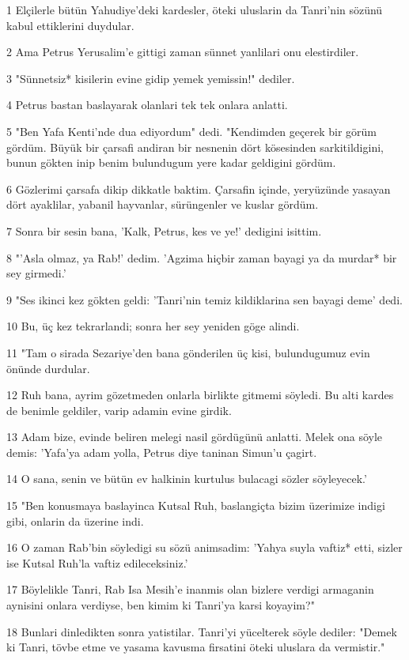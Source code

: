 \par 1 Elçilerle bütün Yahudiye'deki kardesler, öteki uluslarin da Tanri'nin sözünü kabul ettiklerini duydular.
\par 2 Ama Petrus Yerusalim'e gittigi zaman sünnet yanlilari onu elestirdiler.
\par 3 "Sünnetsiz* kisilerin evine gidip yemek yemissin!" dediler.
\par 4 Petrus bastan baslayarak olanlari tek tek onlara anlatti.
\par 5 "Ben Yafa Kenti'nde dua ediyordum" dedi. "Kendimden geçerek bir görüm gördüm. Büyük bir çarsafi andiran bir nesnenin dört kösesinden sarkitildigini, bunun gökten inip benim bulundugum yere kadar geldigini gördüm.
\par 6 Gözlerimi çarsafa dikip dikkatle baktim. Çarsafin içinde, yeryüzünde yasayan dört ayaklilar, yabanil hayvanlar, sürüngenler ve kuslar gördüm.
\par 7 Sonra bir sesin bana, 'Kalk, Petrus, kes ve ye!' dedigini isittim.
\par 8 "'Asla olmaz, ya Rab!' dedim. 'Agzima hiçbir zaman bayagi ya da murdar* bir sey girmedi.'
\par 9 "Ses ikinci kez gökten geldi: 'Tanri'nin temiz kildiklarina sen bayagi deme' dedi.
\par 10 Bu, üç kez tekrarlandi; sonra her sey yeniden göge alindi.
\par 11 "Tam o sirada Sezariye'den bana gönderilen üç kisi, bulundugumuz evin önünde durdular.
\par 12 Ruh bana, ayrim gözetmeden onlarla birlikte gitmemi söyledi. Bu alti kardes de benimle geldiler, varip adamin evine girdik.
\par 13 Adam bize, evinde beliren melegi nasil gördügünü anlatti. Melek ona söyle demis: 'Yafa'ya adam yolla, Petrus diye taninan Simun'u çagirt.
\par 14 O sana, senin ve bütün ev halkinin kurtulus bulacagi sözler söyleyecek.'
\par 15 "Ben konusmaya baslayinca Kutsal Ruh, baslangiçta bizim üzerimize indigi gibi, onlarin da üzerine indi.
\par 16 O zaman Rab'bin söyledigi su sözü animsadim: 'Yahya suyla vaftiz* etti, sizler ise Kutsal Ruh'la vaftiz edileceksiniz.'
\par 17 Böylelikle Tanri, Rab Isa Mesih'e inanmis olan bizlere verdigi armaganin aynisini onlara verdiyse, ben kimim ki Tanri'ya karsi koyayim?"
\par 18 Bunlari dinledikten sonra yatistilar. Tanri'yi yücelterek söyle dediler: "Demek ki Tanri, tövbe etme ve yasama kavusma firsatini öteki uluslara da vermistir."
